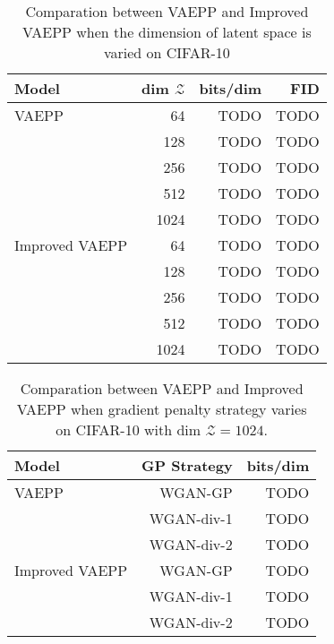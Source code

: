 \begin{table}[tb]
\centering
\begin{tabular}{lrrr}  
\toprule
Model  &  dim $\mathcal{Z}$  &  bits/dim  & FID \\
\midrule
VAEPP            &  64   & TODO  & TODO      \\
                 &  128  & TODO  & TODO     \\
                 &  256  & TODO  & TODO     \\
                 &  512  & TODO  & TODO     \\
                 &  1024 & TODO  & TODO     \\
Improved VAEPP   &  64   & TODO  & TODO     \\
                 &  128  & TODO  & TODO     \\
                 &  256  & TODO  & TODO     \\
                 &  512  & TODO  & TODO     \\
                 &  1024 & TODO  & TODO     \\
\bottomrule
\end{tabular}
\caption{Comparation between VAEPP and Improved VAEPP when the dimension of latent space is varied on CIFAR-10}
\label{tab:compare_nD_over_z_dim}
\end{table}

\begin{table}[tb]
\centering
\begin{tabular}{lrr}  
\toprule
Model  &  GP Strategy  &  bits/dim \\
\midrule
VAEPP            &  WGAN-GP   & TODO      \\
                 &  WGAN-div-1  & TODO      \\
                 &  WGAN-div-2  & TODO      \\
Improved VAEPP   &  WGAN-GP   & TODO      \\
                 &  WGAN-div-1  & TODO     \\
                 &  WGAN-div-2  & TODO      \\
\bottomrule
\end{tabular}
\caption{Comparation between VAEPP and Improved VAEPP when gradient penalty strategy varies on CIFAR-10 with dim $\mathcal{Z} = 1024$. }
\label{tab:compare_nD_over_R}
\end{table}

